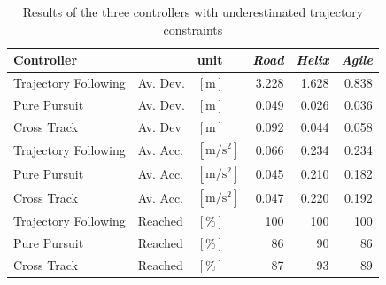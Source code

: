 \begin{table}[h]
\begin{center}
 \begin{tabular}{lll|rrr}
 \hline
 Controller &   & unit & \textit{Road} & \textit{Helix} & \textit{Agile} \\ \hline \hline
 Trajectory Following & Av. Dev. & $[\si{\meter}]$ & 3.228 & 1.628 & 0.838 \\
 Pure Pursuit         & Av. Dev. & $[\si{\meter}]$ & 0.049 & 0.026 & 0.036 \\
 Cross Track          & Av. Dev & $[\si{\meter}]$ &  0.092 & 0.044 & 0.058 \\
    
 Trajectory Following & Av. Acc. & $[\si{\meter\per\square\second}]$ & 0.066 & 0.234 & 0.234 \\
 Pure Pursuit         & Av. Acc. & $[\si{\meter\per\square\second}]$ & 0.045 & 0.210 & 0.182 \\
 Cross Track          & Av. Acc. & $[\si{\meter\per\square\second}]$ & 0.047 & 0.220 & 0.192 \\
 
 Trajectory Following & Reached & $[\si{\percent}]$ & 100 & 100 & 100 \\
 Pure Pursuit         & Reached & $[\si{\percent}]$ &  86 &  90 &  86 \\
 Cross Track          & Reached & $[\si{\percent}]$ &  87 &  93 &  89 \\
 \hline
 \end{tabular}
 \caption{Results of the three controllers with underestimated trajectory constraints}\vspace{1px}
 \label{tab:results_model_uncertainties}
\end{center}
\end{table}

